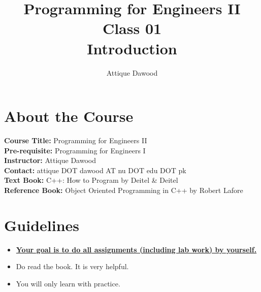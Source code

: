 \documentclass[12pt,a4paper]{article}
\title{\vspace{-2cm}Programming for Engineers II\\Class 01\\Introduction}
\author{Attique Dawood}
\begin{document}
\maketitle
\section{About the Course}
\textbf{Course Title:} Programming for Engineers II\\
\textbf{Pre-requisite:} Programming for Engineers I\\
\textbf{Instructor:} Attique Dawood\\
\textbf{Contact:} attique DOT dawood AT nu DOT edu DOT pk\\
\textbf{Text Book:} C++: How to Program by Deitel \& Deitel\\
\textbf{Reference Book:} Object Oriented Programming in C++ by Robert Lafore\\
\section{Guidelines}
\begin{itemize}
\item \textbf{\underline{Your goal is to do all assignments (including lab work) by yourself.}}
\item Do read the book. It is very helpful.
\item You will only learn with practice.
\end{itemize}
\end{document}
